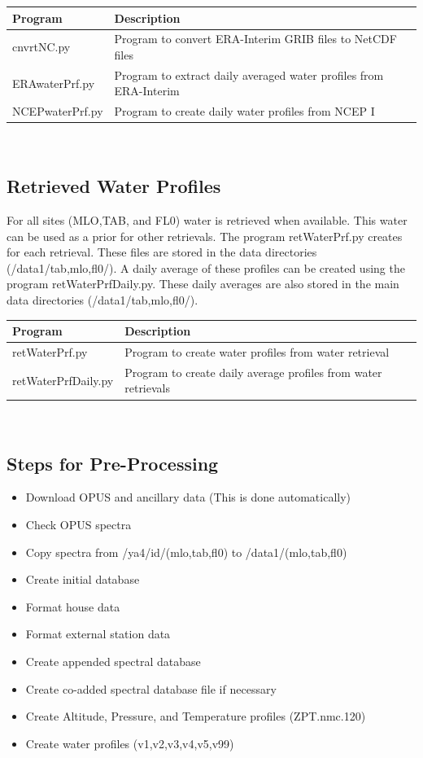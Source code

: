 \documentclass[12pt, letterpaper]{article}
\begin{document}
\begin{tabular}{ l l }
\textbf{Program} & \textbf{Description} \\
\hline
cnvrtNC.py     & Program to convert ERA-Interim GRIB files to NetCDF files\\
ERAwaterPrf.py & Program to extract daily averaged water profiles from ERA-Interim\\
NCEPwaterPrf.py& Program to create daily water profiles from NCEP I\\
\end{tabular} \\


\subsection{Retrieved Water Profiles}
\label{sec:RWP}
For all sites (MLO,TAB, and FL0) water is retrieved when available. This water can be used as a prior for other retrievals. The program retWaterPrf.py creates  for each retrieval. These files are stored in the data directories (/data1/tab,mlo,fl0/). A daily average of these profiles can be created using the program retWaterPrfDaily.py. These daily averages are also stored in the main data directories (/data1/tab,mlo,fl0/).\\

\begin{tabular}{ l l }
\textbf{Program} & \textbf{Description} \\
\hline
retWaterPrf.py      & Program to create water profiles from water retrieval\\
retWaterPrfDaily.py & Program to create daily average profiles from water retrievals\\
\end{tabular} \\


\subsection{Steps for Pre-Processing}
\label{sec:SCSD}

\begin{itemize}
\item Download OPUS and ancillary data (This is done automatically)
\item Check OPUS spectra
\item Copy spectra from /ya4/id/(mlo,tab,fl0) to /data1/(mlo,tab,fl0)
\item Create initial database
\item Format house data
\item Format external station data
\item Create appended spectral database
\item Create co-added spectral database file if necessary
\item Create Altitude, Pressure, and Temperature profiles (ZPT.nmc.120)
\item Create water profiles (v1,v2,v3,v4,v5,v99)
\end{itemize}
\end{document}
